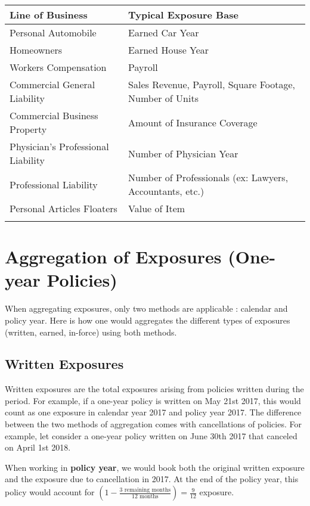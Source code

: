 \documentclass[11pt, english]{memoir}
\numberwithin{definition}{section}
\begin{document}
	\begin{tabular}{ll}
		\toprule[1pt]
		\textbf{Line of Business} & \textbf{Typical Exposure Base}\\
		\midrule[1pt]
		Personal Automobile & Earned Car Year\\
		Homeowners & Earned House Year \\
		Workers Compensation & Payroll \\
		Commercial General Liability & Sales Revenue, Payroll, Square Footage, Number of Units\\
		Commercial Business Property & Amount of Insurance Coverage \\
		Physician's Professional Liability & Number of Physician Year \\
		Professional Liability & Number of Professionals (ex: Lawyers, Accountants, etc.)\\
		Personal Articles Floaters & Value of Item\\
		\bottomrule[1pt]\\
	\end{tabular}
	
	
	
	\section{Aggregation of Exposures (One-year Policies)}
	When aggregating exposures, only two methods are applicable : calendar and policy year. Here is how one would aggregates the different types of exposures (written, earned, in-force) using both methods. 
	
	\subsection{Written Exposures}
	
	Written exposures are the total exposures arising from policies written during the period. For example, if a one-year policy is written on May 21st 2017, this would count as one exposure in calendar year 2017 and policy year 2017. The difference between the two methods of aggregation comes with cancellations of policies. For example, let consider a one-year policy written on June 30th 2017 that canceled on April 1st 2018. 
	
	When working in \textbf{policy year}, we would book both the original written exposure and the exposure due to cancellation in 2017. At the end of the policy year, this policy would account for $(1-\frac{\text{3 remaining months}}{\text{12 months}}) = \frac{9}{12}$ exposure.
	
\end{document}
